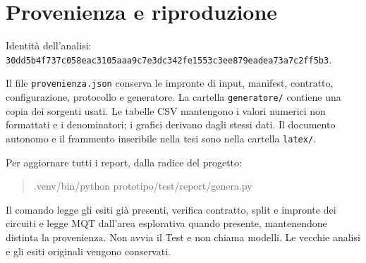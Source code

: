 \FloatBarrier\section{Provenienza e riproduzione}
Identità dell’analisi: \nolinkurl{30dd5b4f737c058eac3105aaa9c7e3dc342fe1553c3ee879eadea73a7c2ff5b3}.

Il file \texttt{provenienza.json} conserva le impronte di input, manifest, contratto, configurazione, protocollo e generatore. La cartella \texttt{generatore/} contiene una copia dei sorgenti usati. Le tabelle CSV mantengono i valori numerici non formattati e i denominatori; i grafici derivano dagli stessi dati. Il documento autonomo e il frammento inseribile nella tesi sono nella cartella \texttt{latex/}.

Per aggiornare tutti i report, dalla radice del progetto:
\begin{quote}\small\ttfamily .venv/bin/python prototipo/test/report/genera.py\end{quote}
Il comando legge gli esiti già presenti, verifica contratto, split e impronte dei circuiti e legge MQT dall’area esplorativa quando presente, mantenendone distinta la provenienza. Non avvia il Test e non chiama modelli. Le vecchie analisi e gli esiti originali vengono conservati.

